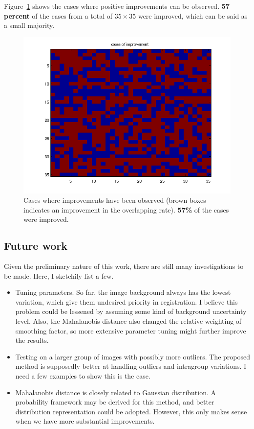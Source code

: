 \documentclass[preprint,review,12pt]{elsarticle}
\begin{document}
Figure~\ref{fig:cases_mah} shows the cases where positive improvements can be observed. {\bf 57 percent} of the cases from a total of $35\times 35$ were improved, which can be said as a small majority.

\begin{figure}[h!!!!!!!!!!!!tb]
\begin{center}
	\includegraphics[width=.8\linewidth]{figs/cases_improved.png}
\end{center}

\caption{Cases where improvements have been observed (brown boxes indicates an improvement in the overlapping rate). {\bf 57\%} of the cases were improved.}
\label{fig:cases_mah}
\end{figure}

\subsection{Future work}
Given the preliminary nature of this work, there are still many investigations to be made. Here, I sketchily list a few.

\begin{itemize}
	\item Tuning parameters. So far, the image background always has the lowest variation, which give them undesired priority in registration. I believe this problem could be lessened by assuming some kind of background uncertainty level. Also, the Mahalanobis distance also changed the relative weighting of smoothing factor, so more extensive parameter tuning might further improve the results.
	\item Testing on a larger group of images with possibly more outliers. The proposed method is supposedly better at handling outliers and intragroup variations. I need a few examples to show this is the case.
	\item Mahalanobis distance is closely related to Gaussian distribution. A probability framework may be derived for this method, and better distribution representation could be adopted. However, this only makes sense when we have more substantial improvements.
\end{itemize}
\end{document}

